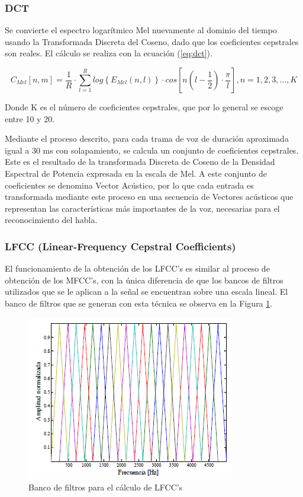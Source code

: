 \subsubsection*{DCT}

Se convierte el espectro logarítmico Mel nuevamente al dominio del tiempo usando la Transformada Discreta del Coseno, dado que los coeficientes cepstrales son reales. El cálculo se realiza con la ecuación (\ref{eq:dct}).

\begin{equation}\label{eq:dct}
	C_{Mel}[n,m]=\frac{1}{R}\cdot \sum_{l=1}^{R}{log\left \{ E_{Mel}(n,l)\right \}\cdot cos[n(l-\frac{1}{2})\cdot \frac{\pi}{l}]}, n=1,2,3,...,K
\end{equation}

Donde K es el número de coeficientes cepstrales, que por lo general se escoge entre 10 y 20.

Mediante el proceso descrito, para cada trama de voz de duración aproximada igual a 30 ms con solapamiento, se calcula un conjunto de coeficientes cepstrales. Este es el resultado de la transformada Discreta de Coseno de la Densidad Espectral de Potencia expresada en la escala de Mel. A este conjunto de coeficientes se denomina Vector Acústico, por lo que cada entrada es transformada mediante este proceso en una secuencia de Vectores acústicos que representan las características más importantes de la voz, necesarias para el reconocimiento del habla. \cite{SalcedoCherubini2006}

\subsubsection{LFCC (Linear-Frequency Cepstral Coefficients)}

El funcionamiento de la obtención de los LFCC’s es similar al proceso de obtención de los MFCC’s, con la única diferencia de que los bancos de filtros utilizados que se le aplican a la señal se encuentran sobre una escala lineal. El banco de filtros que se generan con esta técnica se observa en la Figura \ref{fig:lfcc}.

\begin{figure}[H]
	\centering
	\includegraphics[width=0.6\linewidth]{figures/lfcc}
	\caption{Banco de filtros para el cálculo de LFCC's}
	\label{fig:lfcc}
\end{figure}


